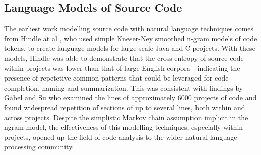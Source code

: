 

\subsection{Language Models of Source Code}

The earliest work modelling source code with natural language techniques comes from Hindle at al \cite{hindle_naturalness_nodate}, who used simple Kneser-Ney smoothed n-gram models of code tokens, to create language models for large-scale Java and C projects.
With these models, Hindle was able to demonstrate that the cross-entropy of source code within projects was lower than that of large English corpora - indicating the presence of repetetive common patterns that could be leveraged for code completion, naming and summarization.
This was consistent with findings by Gabel and Su \cite{gabel_study_2010} who examined the lines of approximately 6000 projects of code and found widespread repetition of sections of up to several lines, both within and across projects.
Despite the simplistic Markov chain assumption implicit in the ngram model, the effectiveness of this modelling techniques, especially within projects, opened up the field of code analysis to the wider natural language processing community.

